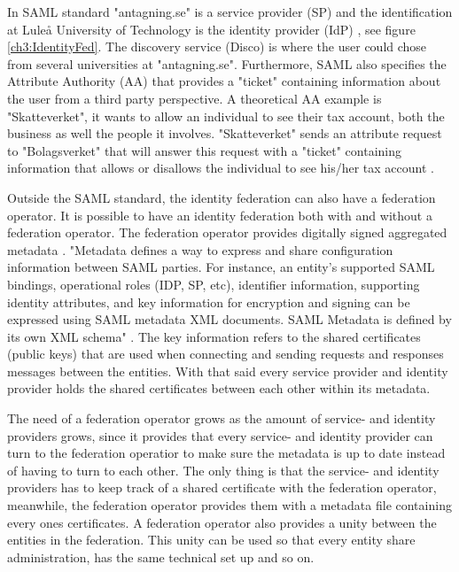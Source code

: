 In SAML standard "antagning.se" is a service provider (SP) \cite[p.~11]{pdf:oasis-open-glossary} and the identification at 
Lule\r{a} University of Technology is the identity provider (IdP) \cite[p.~7]{pdf:oasis-open-glossary}, see figure \ref{ch3:IdentityFed}.
The discovery service (Disco) is where the user could chose from several universities at "antagning.se".
Furthermore, SAML also specifies the Attribute Authority (AA) that provides 
a "ticket" containing information about the user from a third party perspective. A theoretical AA example is "Skatteverket", it wants to 
allow an individual to see their tax account, both the business as well the people it involves. 
"Skatteverket" sends an attribute request to "Bolagsverket" that will answer this request 
with a "ticket" containing information that allows or disallows the individual to see his/her tax account \cite[p.~284]{pdf:SOU}.

Outside the SAML standard, the identity federation can also have a federation operator. It is possible to have an identity federation both 
with and without a federation operator. 
The federation operator provides digitally signed aggregated metadata \cite[p.~3]{pdf:Skolfederation}. 
"Metadata defines a way to express and share configuration information between SAML parties.
For instance, an entity's supported SAML bindings, operational roles (IDP, SP, etc), identifier information,
supporting identity attributes, and key information for encryption and signing can be expressed using SAML
metadata XML documents. SAML Metadata is defined by its own XML schema" \cite[p.~16]{pdf:oasis-open}.
The key information refers to the shared certificates (public keys) that are used when connecting and sending requests and responses 
messages between the entities.
With that said every service provider and identity provider holds the shared certificates between each other within its metadata. 

The need of a federation operator grows as the amount of service- and identity providers grows,
since it provides that every service- and identity provider can turn to the federation operatior to make sure the metadata is up to date 
instead of having to turn to each other. 
The only thing is that the service- and identity providers has to keep track of a shared certificate with the federation operator, 
meanwhile, the federation operator provides them with a metadata file containing every ones certificates.
A federation operator also provides a unity between the entities in the federation. This unity can be used so that every entity share 
administration, has the same technical set up and so on.

